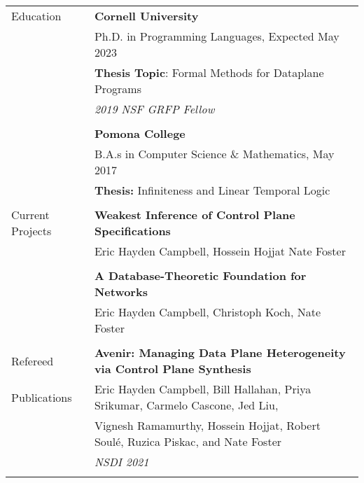 \documentclass[letterpaper,10pt,oneside]{article}
\begin{document}
\noindent
\begin{tabular}{@{} l l}
  \Large{Education} 
  & \textbf{Cornell University} \\
  & Ph.D. in Programming Languages, Expected May 2023 \\
  & \textbf{Thesis Topic}: Formal Methods for Dataplane Programs \\
  & \textit{2019 NSF GRFP Fellow} \\
  \\


  & \textbf{Pomona College} \\
  & B.A.s in Computer Science \& Mathematics, May 2017 \\
  & \textbf{Thesis:} Infiniteness and Linear Temporal Logic \\
  & \\



  \Large{Current Projects}
  & \textbf{Weakest Inference of Control Plane Specifications} \\
  & Eric Hayden Campbell, Hossein Hojjat Nate Foster \\
  & \\

  & \textbf{A Database-Theoretic Foundation for Networks} \\
  & Eric Hayden Campbell, Christoph Koch, Nate Foster \\
  & \\

  \Large{Refereed}
  & \textbf{Avenir: Managing Data Plane Heterogeneity via Control Plane Synthesis}\\
  \Large{Publications}
  & Eric Hayden Campbell, Bill Hallahan, Priya Srikumar, Carmelo Cascone, Jed Liu, \\ & Vignesh Ramamurthy, Hossein Hojjat, Robert  Soul\'{e}, Ruzica Piskac,  and  Nate Foster\\
  & \textit{NSDI 2021} \\
  &\\


\end{tabular}
\end{document}
